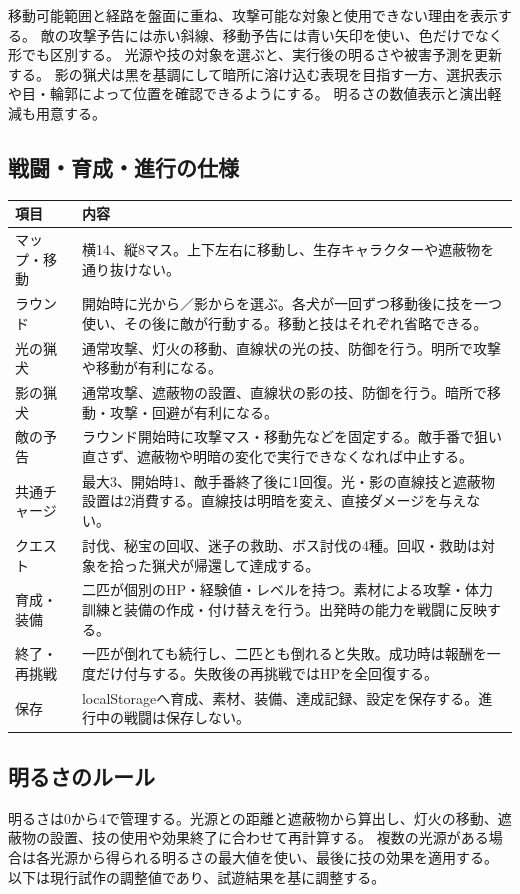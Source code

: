 \documentclass[a4paper,11pt,dvipdfmx]{jsarticle}
\begin{document}
移動可能範囲と経路を盤面に重ね、攻撃可能な対象と使用できない理由を表示する。
敵の攻撃予告には赤い斜線、移動予告には青い矢印を使い、色だけでなく形でも区別する。
光源や技の対象を選ぶと、実行後の明るさや被害予測を更新する。
影の猟犬は黒を基調にして暗所に溶け込む表現を目指す一方、選択表示や目・輪郭によって位置を確認できるようにする。
明るさの数値表示と演出軽減も用意する。

\subsection{戦闘・育成・進行の仕様}
\begin{tabularx}{\linewidth}{@{}p{27mm}Y@{}}
\toprule
項目 & 内容 \\
\midrule
マップ・移動 & 横14、縦8マス。上下左右に移動し、生存キャラクターや遮蔽物を通り抜けない。\\
ラウンド & 開始時に光から／影からを選ぶ。各犬が一回ずつ移動後に技を一つ使い、その後に敵が行動する。移動と技はそれぞれ省略できる。\\
光の猟犬 & 通常攻撃、灯火の移動、直線状の光の技、防御を行う。明所で攻撃や移動が有利になる。\\
影の猟犬 & 通常攻撃、遮蔽物の設置、直線状の影の技、防御を行う。暗所で移動・攻撃・回避が有利になる。\\
敵の予告 & ラウンド開始時に攻撃マス・移動先などを固定する。敵手番で狙い直さず、遮蔽物や明暗の変化で実行できなくなれば中止する。\\
共通チャージ & 最大3、開始時1、敵手番終了後に1回復。光・影の直線技と遮蔽物設置は2消費する。直線技は明暗を変え、直接ダメージを与えない。\\
クエスト & 討伐、秘宝の回収、迷子の救助、ボス討伐の4種。回収・救助は対象を拾った猟犬が帰還して達成する。\\
育成・装備 & 二匹が個別のHP・経験値・レベルを持つ。素材による攻撃・体力訓練と装備の作成・付け替えを行う。出発時の能力を戦闘に反映する。\\
終了・再挑戦 & 一匹が倒れても続行し、二匹とも倒れると失敗。成功時は報酬を一度だけ付与する。失敗後の再挑戦ではHPを全回復する。\\
保存 & localStorageへ育成、素材、装備、達成記録、設定を保存する。進行中の戦闘は保存しない。\\
\bottomrule
\end{tabularx}

\subsection{明るさのルール}
明るさは0から4で管理する。光源との距離と遮蔽物から算出し、灯火の移動、遮蔽物の設置、技の使用や効果終了に合わせて再計算する。
複数の光源がある場合は各光源から得られる明るさの最大値を使い、最後に技の効果を適用する。
以下は現行試作の調整値であり、試遊結果を基に調整する。
\end{document}
